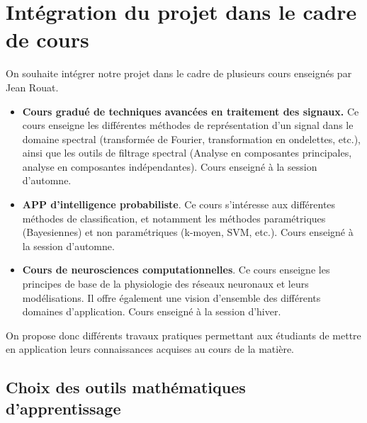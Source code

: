 \chapter{Intégration du projet dans le cadre de cours}
\thispagestyle{fancy}

On souhaite intégrer notre projet dans le cadre de plusieurs cours enseignés par Jean Rouat.
\smallbreak
\begin{itemize}
	\item \textbf{Cours gradué de techniques avancées en traitement des signaux.} Ce cours enseigne les différentes méthodes de représentation d'un signal dans le domaine spectral (transformée de Fourier, transformation en ondelettes, etc.), ainsi que les outils de filtrage spectral (Analyse en composantes principales, analyse en composantes indépendantes). Cours enseigné à la session d'automne. 
	\smallbreak
	\item\textbf{APP d'intelligence probabiliste}. Ce cours s'intéresse aux différentes méthodes de classification, et notamment les méthodes paramétriques (Bayesiennes) et non paramétriques (k-moyen, SVM, etc.). Cours enseigné à la session d'automne.
	\smallbreak
	\item \textbf{Cours de neurosciences computationnelles}. Ce cours enseigne les principes de base de la physiologie des réseaux neuronaux et leurs modélisations. Il offre également une vision d'ensemble des différents domaines d'application. Cours enseigné à la session d'hiver.
\end{itemize} 

On propose donc différents travaux pratiques permettant aux étudiants de mettre en application leurs connaissances acquises au cours de la matière.

\section{Choix des outils mathématiques d'apprentissage}

